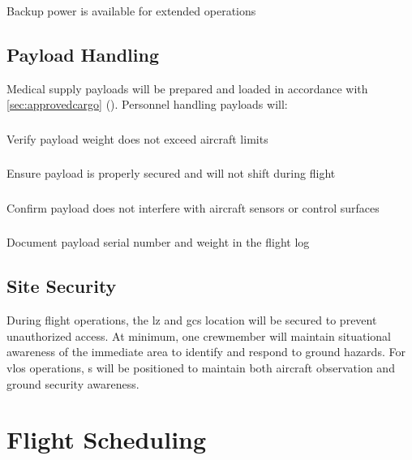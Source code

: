             \subsubsection{} Backup power is available for extended operations

    \subsection{Payload Handling}\label{ssec:payloadhandling}
    
    Medical supply payloads will be prepared and loaded in accordance with \cref{sec:approvedcargo} (). Personnel handling payloads will:

        \subsubsection{} Verify payload weight does not exceed aircraft limits
        \subsubsection{} Ensure payload is properly secured and will not shift during flight
        \subsubsection{} Confirm payload does not interfere with aircraft sensors or control surfaces
        \subsubsection{} Document payload serial number and weight in the flight log

    \subsection{Site Security}\label{ssec:sitesecurity}

        During flight operations, the \ac{lz} and \ac{gcs} location will be secured to prevent unauthorized access. At minimum, one crewmember will maintain situational awareness of the immediate area to identify and respond to ground hazards. For \ac{vlos} operations, s will be positioned to maintain both aircraft observation and ground security awareness.

\section{Flight Scheduling}\label{sec:flightscheduling}

